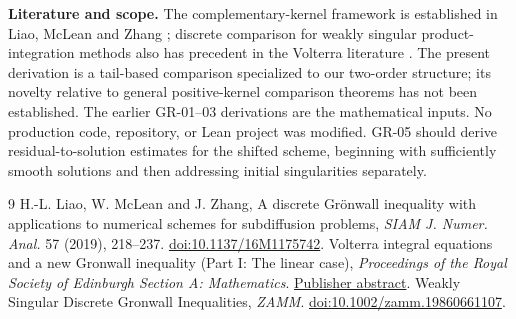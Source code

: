 \documentclass[11pt,a4paper]{article}
\begin{document}
\textbf{Literature and scope.} The complementary-kernel framework is established in Liao, McLean and Zhang \cite{liao}; discrete comparison for weakly singular product-integration methods also has precedent in the Volterra literature \cite{volterra,weak}. The present derivation is a tail-based comparison specialized to our two-order structure; its novelty relative to general positive-kernel comparison theorems has not been established. The earlier GR-01--03 derivations are the mathematical inputs. No production code, repository, or Lean project was modified. GR-05 should derive residual-to-solution estimates for the shifted scheme, beginning with sufficiently smooth solutions and then addressing initial singularities separately.
\begin{thebibliography}{9}
 H.-L. Liao, W. McLean and J. Zhang, A discrete Gr\"onwall inequality with applications to numerical schemes for subdiffusion problems, \emph{SIAM J. Numer. Anal.} 57 (2019), 218--237. \href{https://doi.org/10.1137/16M1175742}{doi:10.1137/16M1175742}.
 Volterra integral equations and a new Gronwall inequality (Part I: The linear case), \emph{Proceedings of the Royal Society of Edinburgh Section A: Mathematics}. \href{https://www.cambridge.org/core/journals/proceedings-of-the-royal-society-of-edinburgh-section-a-mathematics/article/abs/volterra-integral-equations-and-a-new-gronwall-inequality-part-i-the-linear-case/D4B84BA2D0CFF988F6D72D4B9273A7BA}{Publisher abstract}.
 Weakly Singular Discrete Gronwall Inequalities, \emph{ZAMM}. \href{https://doi.org/10.1002/zamm.19860661107}{doi:10.1002/zamm.19860661107}.
\end{thebibliography}
\end{document}
